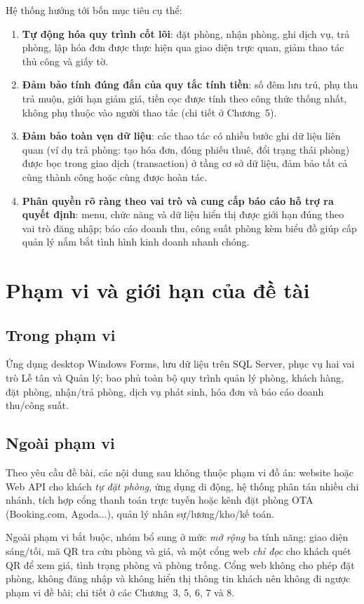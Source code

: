 \documentclass[14pt]{report}
\begin{document}
Hệ thống hướng tới bốn mục tiêu cụ thể:

\begin{enumerate}
  \item \textbf{Tự động hóa quy trình cốt lõi}: đặt phòng, nhận phòng, ghi dịch vụ, trả phòng, lập hóa đơn được thực hiện qua giao diện trực quan, giảm thao tác thủ công và giấy tờ.
  \item \textbf{Đảm bảo tính đúng đắn của quy tắc tính tiền}: số đêm lưu trú, phụ thu trả muộn, giới hạn giảm giá, tiền cọc được tính theo công thức thống nhất, không phụ thuộc vào người thao tác (chi tiết ở Chương~5).
  \item \textbf{Đảm bảo toàn vẹn dữ liệu}: các thao tác có nhiều bước ghi dữ liệu liên quan (ví dụ trả phòng: tạo hóa đơn, đóng phiếu thuê, đổi trạng thái phòng) được bọc trong giao dịch (transaction) ở tầng cơ sở dữ liệu, đảm bảo tất cả cùng thành công hoặc cùng được hoàn tác.
  \item \textbf{Phân quyền rõ ràng theo vai trò và cung cấp báo cáo hỗ trợ ra quyết định}: menu, chức năng và dữ liệu hiển thị được giới hạn đúng theo vai trò đăng nhập; báo cáo doanh thu, công suất phòng kèm biểu đồ giúp cấp quản lý nắm bắt tình hình kinh doanh nhanh chóng.
\end{enumerate}

\section{Phạm vi và giới hạn của đề tài}

\subsection{Trong phạm vi}
Ứng dụng desktop Windows Forms, lưu dữ liệu trên SQL Server, phục vụ hai vai trò Lễ tân và Quản lý; bao phủ toàn bộ quy trình quản lý phòng, khách hàng, đặt phòng, nhận/trả phòng, dịch vụ phát sinh, hóa đơn và báo cáo doanh thu/công suất.

\subsection{Ngoài phạm vi}
Theo yêu cầu đề bài, các nội dung sau không thuộc phạm vi đồ án: website hoặc Web API cho khách \emph{tự đặt phòng}, ứng dụng di động, hệ thống phân tán nhiều chi nhánh, tích hợp cổng thanh toán trực tuyến hoặc kênh đặt phòng OTA (Booking.com, Agoda...), quản lý nhân sự/lương/kho/kế toán.

Ngoài phạm vi bắt buộc, nhóm bổ sung ở mức \emph{mở rộng} ba tính năng: giao diện sáng/tối, mã QR tra cứu phòng và giá, và một cổng web \emph{chỉ đọc} cho khách quét QR để xem giá, tình trạng phòng và phòng trống. Cổng web không cho phép đặt phòng, không đăng nhập và không hiển thị thông tin khách nên không đi ngược phạm vi đề bài; chi tiết ở các Chương~3, 5, 6, 7 và 8.
\end{document}

